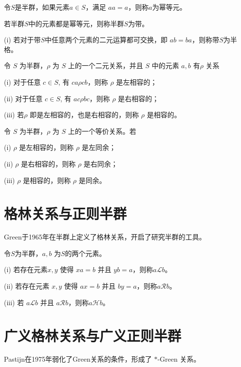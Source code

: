 \begin{definition}
    令$S$是半群，如果元素$a\in S$，满足 $aa=a$，则称$a$为幂等元。
\end{definition}

\begin{definition}
    若半群$S$中的元素都是幂等元，则称半群$S$为带。

    (i) 若对于带$S$中任意两个元素的二元运算都可交换，即 $ab=ba$，则称带$S$为半格。
\end{definition}

\begin{definition}
    令 $S$ 为半群，$\rho$ 为 $S$ 上的一个二元关系，并且 $S$ 中的元素 $a, b$ 有$\rho$ 关系

    (i) 对于任意 $c \in S$, 有 $ca \rho cb$，则称 $\rho$ 是左相容的；

    (ii) 对于任意 $c \in S$, 有 $ac \rho bc$，则称 $\rho$ 是右相容的；

    (iii) 若$\rho$ 即是左相容的，也是右相容的，则称 $\rho$ 是相容的。
\end{definition}

\begin{definition}
    令 $S$ 为半群，$\rho$ 为 $S$ 上的一个等价关系。若

    (i) $\rho$ 是左相容的，则称 $\rho$ 是左同余；

    (ii) $\rho$ 是右相容的，则称 $\rho$ 是右同余；

    (iii) $\rho$ 是相容的，则称 $\rho$ 是同余。
\end{definition}




\section{格林关系与正则半群}
Green于1965年在半群上定义了格林关系，开启了研究半群的工具。
\begin{definition}
    令$S$为半群，$a, b$ 为$S$的两个元素。

    (i) 若存在元素$x, y$ 使得 $xa=b$ 并且 $yb=a$，则称$a\mathcal{L}b$。

    (ii) 若存在元素 $x, y$ 使得 $ax=b$ 并且 $by=a$，则称$a\mathcal{R}b$。

    (iii) 若 $a\mathcal{L}b$ 并且 $a\mathcal{R}b$，则称$a\mathcal{H}b$。
    
    
\end{definition}
\section{广义格林关系与广义正则半群}
Pastijn在1975年弱化了Green关系的条件，形成了 $\ast$-Green 关系。

